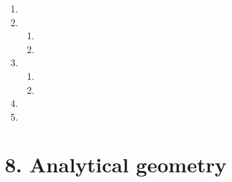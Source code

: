 \begin{enumerate}[itemsep=6pt, label=\textbf{\arabic*}. ]
\item %
\item %
\begin{enumerate}[noitemsep, label=\textbf{(\alph*)} ]
\item %
\item %
\end{enumerate} 
\item %
\begin{enumerate}[noitemsep, label=\textbf{(\alph*)} ] 
\item %
\item %
\end{enumerate} 
\item %
\item %

\end{enumerate}


\section {8. Analytical geometry}

